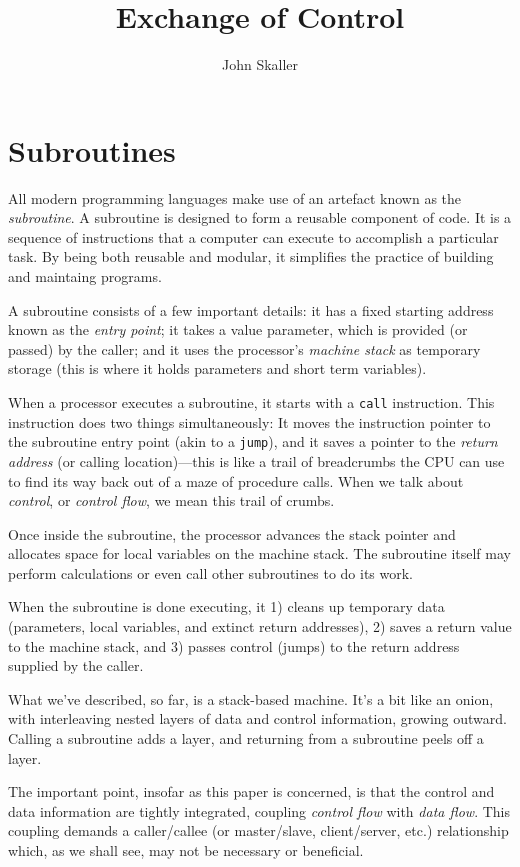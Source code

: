 \documentclass{article}
\title{Exchange of Control}
\author{John Skaller}
\begin{document}
\maketitle

\section{Subroutines}

All modern programming languages make use of an artefact known as the {\em subroutine}. 
A subroutine is designed to form a reusable component of code.  
It is a sequence of instructions that a computer can execute to accomplish a particular task.
By being both reusable and modular, it simplifies the practice of building and maintaing programs.

A subroutine consists of a few important details: 
it has a fixed starting address known as the {\em entry point}; 
it takes a value parameter, which is provided (or passed) by the caller; 
and it uses the processor's {\em machine stack} as temporary storage (this is where it holds parameters and short term variables).

When a processor executes a subroutine, it starts with a {\tt call} instruction.
This instruction does two things simultaneously: 
It moves the instruction pointer to the subroutine entry point (akin to a {\tt jump}), 
and it saves a pointer to the {\em return address} (or calling location)---this 
is like a trail of breadcrumbs the CPU can use to find its way back out of a maze of procedure calls.
When we talk about {\em control}, or {\em control flow}, we mean this trail of crumbs.

Once inside the subroutine, the processor advances the stack pointer and allocates space for local variables on the machine stack.
The subroutine itself may perform calculations or even call other subroutines to do its work.

When the subroutine is done executing, it 
1) cleans up temporary data (parameters, local variables, and extinct return addresses), 
2) saves a return value to the machine stack, and 
3) passes control (jumps) to the return address supplied by the caller.

What we've described, so far, is a stack-based machine. 
It's a bit like an onion, with interleaving nested layers of data and control information, growing outward.
Calling a subroutine adds a layer, and returning from a subroutine peels off a layer.

The important point, insofar as this paper is concerned, is that the control and data information are tightly integrated, coupling {\em control flow} with {\em data flow}. 
This coupling demands a caller/callee (or master/slave, client/server, etc.) relationship which, as we shall see, may not be necessary or beneficial.
\end{document}
